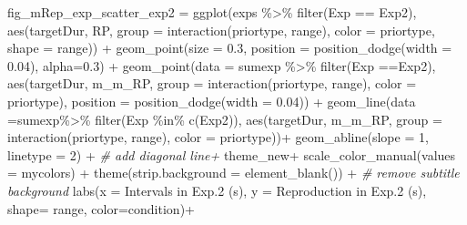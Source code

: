 \documentclass[
]{article}
\newenvironment{Shaded}{\begin{snugshade}}{\end{snugshade}}
\newcommand{\AttributeTok}[1]{\textcolor[rgb]{0.77,0.63,0.00}{#1}}
\newcommand{\CommentTok}[1]{\textcolor[rgb]{0.56,0.35,0.01}{\textit{#1}}}
\newcommand{\DecValTok}[1]{\textcolor[rgb]{0.00,0.00,0.81}{#1}}
\newcommand{\FloatTok}[1]{\textcolor[rgb]{0.00,0.00,0.81}{#1}}
\newcommand{\FunctionTok}[1]{\textcolor[rgb]{0.00,0.00,0.00}{#1}}
\newcommand{\NormalTok}[1]{#1}
\newcommand{\OtherTok}[1]{\textcolor[rgb]{0.56,0.35,0.01}{#1}}
\newcommand{\SpecialCharTok}[1]{\textcolor[rgb]{0.00,0.00,0.00}{#1}}
\newcommand{\StringTok}[1]{\textcolor[rgb]{0.31,0.60,0.02}{#1}}
\begin{document}
\begin{Shaded}
\begin{Highlighting}[]
\NormalTok{fig\_mRep\_exp\_scatter\_exp2 }\OtherTok{=} \FunctionTok{ggplot}\NormalTok{(exps }\SpecialCharTok{\%\textgreater{}\%} \FunctionTok{filter}\NormalTok{(Exp }\SpecialCharTok{==} \StringTok{\textquotesingle{}Exp2\textquotesingle{}}\NormalTok{),}
                                   \FunctionTok{aes}\NormalTok{(targetDur, RP, }\AttributeTok{group =} \FunctionTok{interaction}\NormalTok{(priortype, range), }\AttributeTok{color =}\NormalTok{ priortype, }\AttributeTok{shape =}\NormalTok{ range)) }\SpecialCharTok{+} 
  \FunctionTok{geom\_point}\NormalTok{(}\AttributeTok{size =} \FloatTok{0.3}\NormalTok{, }\AttributeTok{position =} \FunctionTok{position\_dodge}\NormalTok{(}\AttributeTok{width =} \FloatTok{0.04}\NormalTok{), }\AttributeTok{alpha=}\FloatTok{0.3}\NormalTok{) }\SpecialCharTok{+} 
  \FunctionTok{geom\_point}\NormalTok{(}\AttributeTok{data =}\NormalTok{ sumexp }\SpecialCharTok{\%\textgreater{}\%} \FunctionTok{filter}\NormalTok{(Exp }\SpecialCharTok{==}\StringTok{\textquotesingle{}Exp2\textquotesingle{}}\NormalTok{), }\FunctionTok{aes}\NormalTok{(targetDur, m\_m\_RP, }\AttributeTok{group =} \FunctionTok{interaction}\NormalTok{(priortype, range), }\AttributeTok{color =}\NormalTok{ priortype), }\AttributeTok{position =} \FunctionTok{position\_dodge}\NormalTok{(}\AttributeTok{width =} \FloatTok{0.04}\NormalTok{)) }\SpecialCharTok{+} 
  \FunctionTok{geom\_line}\NormalTok{(}\AttributeTok{data =}\NormalTok{sumexp}\SpecialCharTok{\%\textgreater{}\%} \FunctionTok{filter}\NormalTok{(Exp }\SpecialCharTok{\%in\%} \FunctionTok{c}\NormalTok{(}\StringTok{\textquotesingle{}Exp2\textquotesingle{}}\NormalTok{)), }\FunctionTok{aes}\NormalTok{(targetDur, m\_m\_RP, }\AttributeTok{group =} \FunctionTok{interaction}\NormalTok{(priortype, range), }\AttributeTok{color =}\NormalTok{ priortype))}\SpecialCharTok{+}
  \FunctionTok{geom\_abline}\NormalTok{(}\AttributeTok{slope =} \DecValTok{1}\NormalTok{, }\AttributeTok{linetype =} \DecValTok{2}\NormalTok{) }\SpecialCharTok{+} \CommentTok{\# add diagonal line+}
\NormalTok{  theme\_new}\SpecialCharTok{+} 
  \FunctionTok{scale\_color\_manual}\NormalTok{(}\AttributeTok{values =}\NormalTok{ mycolors) }\SpecialCharTok{+}
  \FunctionTok{theme}\NormalTok{(}\AttributeTok{strip.background =} \FunctionTok{element\_blank}\NormalTok{()) }\SpecialCharTok{+} \CommentTok{\# remove subtitle background}
  \FunctionTok{labs}\NormalTok{(}\AttributeTok{x =} \StringTok{\textquotesingle{}Intervals in Exp.2 (s)\textquotesingle{}}\NormalTok{, }\AttributeTok{y =} \StringTok{\textquotesingle{}Reproduction in Exp.2 (s)\textquotesingle{}}\NormalTok{, }\AttributeTok{shape=} \StringTok{\textquotesingle{}range\textquotesingle{}}\NormalTok{, }\AttributeTok{color=}\StringTok{\textquotesingle{}condition\textquotesingle{}}\NormalTok{)}\SpecialCharTok{+}

\end{Highlighting}
\end{Shaded}
\end{document}
